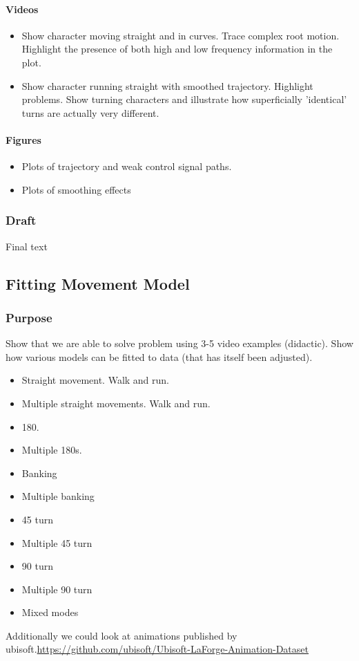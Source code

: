 \paragraph{Videos}
\begin{itemize}
    \item Show character moving straight and in curves. Trace complex root motion. Highlight the presence of both high and low frequency information in the plot.
    \item Show character running straight with smoothed trajectory. Highlight problems. Show turning characters and illustrate how superficially 'identical' turns are actually very different.
\end{itemize}
\paragraph{Figures}
\begin{itemize}
    \item Plots of trajectory and weak control signal paths.
    \item Plots of smoothing effects
\end{itemize}

\subsubsection{Draft}
Final text

\subsection{Fitting Movement Model}
\subsubsection{Purpose} Show that we are able to solve problem using 3-5 video examples (didactic).
Show how various models can be fitted to data (that has itself been adjusted). 
\begin{itemize}
    \item Straight movement. Walk and run. 
    \item Multiple straight movements. Walk and run. 
    \item 180.
    \item Multiple 180s.
    \item Banking
    \item Multiple banking
    \item 45 turn
    \item Multiple 45 turn
    \item 90 turn
    \item Multiple 90 turn
    \item Mixed modes
\end{itemize}
Additionally we could look at animations published by ubisoft.\url{https://github.com/ubisoft/Ubisoft-LaForge-Animation-Dataset}


